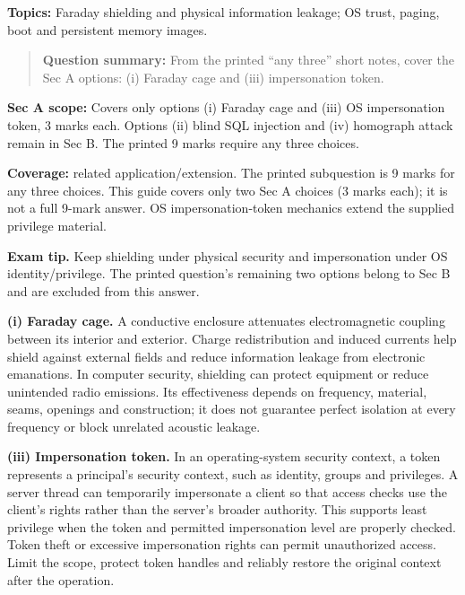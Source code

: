 \documentclass[11pt,a4paper]{article}
\begin{document}
\textbf{Topics:} Faraday shielding and physical information leakage; OS trust,\allowbreak{} paging,\allowbreak{} boot and persistent memory images.



\begin{quote}\small

\textbf{Question summary:} From the printed “any three” short notes,\allowbreak{} cover the Sec A options: (i) Faraday cage and (iii) impersonation token.



\end{quote}

\textbf{Sec A scope:} Covers only options (i) Faraday cage and (iii) OS impersonation token,\allowbreak{} 3 marks each. Options (ii) blind SQL injection and (iv) homograph attack remain in Sec B. The printed 9 marks require any three choices.


\textbf{Coverage:} related application/\allowbreak{}extension. The printed subquestion is 9 marks for any three choices. This guide covers only two Sec A choices (3 marks each); it is not a full 9-mark answer. OS impersonation-token mechanics extend the supplied privilege material.



{\color{ForestGreen}\textbf{Exam tip.} Keep shielding under physical security and impersonation under OS identity/\allowbreak{}privilege. The printed question's remaining two options belong to Sec B and are excluded from this answer.}


\textbf{(i) Faraday cage.} A conductive enclosure attenuates electromagnetic coupling between its interior and exterior. Charge redistribution and induced currents help shield against external fields and reduce information leakage from electronic emanations. In computer security,\allowbreak{} shielding can protect equipment or reduce unintended radio emissions. Its effectiveness depends on frequency,\allowbreak{} material,\allowbreak{} seams,\allowbreak{} openings and construction; it does not guarantee perfect isolation at every frequency or block unrelated acoustic leakage.


\textbf{(iii) Impersonation token.} In an operating-system security context,\allowbreak{} a token represents a principal's security context,\allowbreak{} such as identity,\allowbreak{} groups and privileges. A server thread can temporarily impersonate a client so that access checks use the client's rights rather than the server's broader authority. This supports least privilege when the token and permitted impersonation level are properly checked. Token theft or excessive impersonation rights can permit unauthorized access. Limit the scope,\allowbreak{} protect token handles and reliably restore the original context after the operation.
\end{document}
